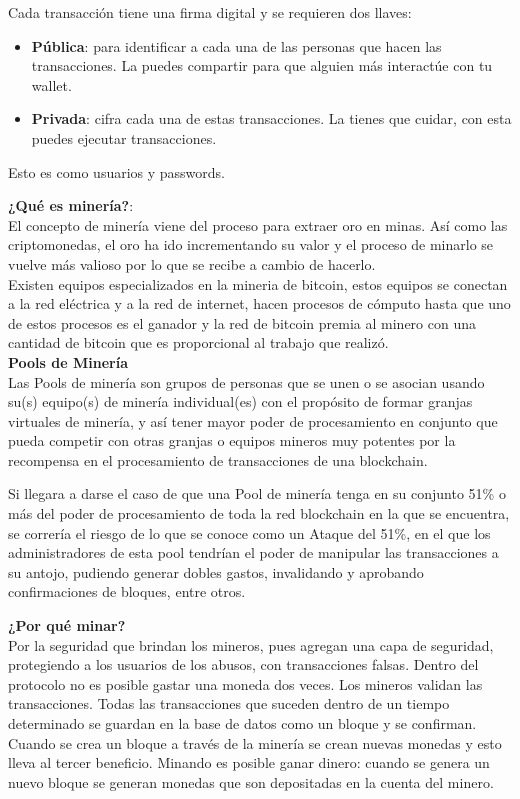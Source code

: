 \documentclass[a4paper,12pt]{/home/armando/Documentos/Cursos/LaTeX/Plantillas/lib/pub}
\begin{document}
Cada transacción tiene una firma digital y se requieren dos llaves:
\begin{itemize}	
	\item \textbf{Pública}: para identificar a cada una de las personas que hacen las transacciones.
	La puedes compartir para que alguien más interactúe con tu wallet.
	\item \textbf{Privada}: cifra cada una de estas transacciones.
	La tienes que cuidar, con esta puedes ejecutar transacciones.
\end{itemize}
Esto es como usuarios y passwords.

\textbf{¿Qué es minería?}:\\
El concepto de minería viene del proceso para extraer oro en minas. Así como las criptomonedas, el oro ha ido incrementando su valor y el proceso de minarlo se vuelve más valioso por lo que se recibe a cambio de hacerlo.\\
Existen equipos especializados en la mineria de bitcoin, estos equipos se conectan a la red eléctrica y a la red de internet, hacen procesos de cómputo hasta que uno de estos procesos es el ganador y la red de bitcoin premia al minero con una cantidad de bitcoin que es proporcional al trabajo que realizó.
\\

\textbf{Pools de Minería}\\

Las Pools de minería son grupos de personas que se unen o se asocian usando su(s) equipo(s) de minería individual(es) con el propósito de formar granjas virtuales de minería, y así tener mayor poder de procesamiento en conjunto que pueda competir con otras granjas o equipos mineros muy potentes por la recompensa en el procesamiento de transacciones de una blockchain.

Si llegara a darse el caso de que una Pool de minería tenga en su conjunto 51\% o más del poder de procesamiento de toda la red blockchain en la que se encuentra, se correría el riesgo de lo que se conoce como un Ataque del 51\%, en el que los administradores de esta pool tendrían el poder de manipular las transacciones a su antojo, pudiendo generar dobles gastos, invalidando y aprobando confirmaciones de bloques, entre otros.

\textbf{¿Por qué minar?}\\

Por la seguridad que brindan los mineros, pues agregan una capa de seguridad, protegiendo a los usuarios de los abusos, con transacciones falsas. Dentro del protocolo no es posible gastar una moneda dos veces. Los mineros validan las transacciones.
Todas las transacciones que suceden dentro de un tiempo determinado se guardan en la base de datos como un bloque y se confirman. Cuando se crea un bloque a través de la minería se crean nuevas monedas y esto lleva al tercer beneficio.
Minando es posible ganar dinero: cuando se genera un nuevo bloque se generan monedas que son depositadas en la cuenta del minero.
\end{document}
